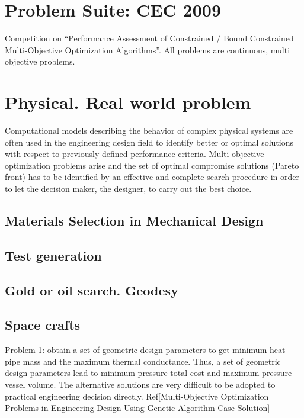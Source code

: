 \documentclass[ms,english]{stthesis}
\begin{document}
            \section{Problem Suite: CEC 2009}
            Competition on “Performance Assessment of Constrained / Bound Constrained Multi-Objective Optimization Algorithms”. All problems are continuous, multi objective problems.

            \section{Physical. Real world problem}

                Computational models describing the behavior of complex physical systems are often used in 
                the engineering design field to identify better or optimal solutions with respect to previously 
                defined performance criteria. Multi-objective optimization problems arise and the set of optimal compromise 
                solutions (Pareto front) has to be identified by an effective and complete search procedure in order to let the 
                decision maker, the designer, to carry out the best choice.

                \subsection{Materials Selection in Mechanical Design}
                \subsection{Test generation}
                \subsection{Gold or oil search. Geodesy}
                \subsection{Space crafts}
                Problem 1: obtain a set of geometric design parameters to get minimum heat pipe mass and the maximum thermal conductance.
                Thus, a set of geometric design parameters lead to minimum pressure total cost and maximum pressure vessel volume. 
                The alternative solutions are very difficult to be adopted to practical engineering decision directly. 
                Ref[Multi-Objective Optimization Problems in Engineering Design Using Genetic Algorithm Case Solution]
\end{document}
